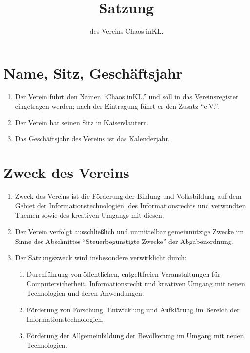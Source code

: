 \documentclass[a4paper, 12pt]{scrartcl}
\title{Satzung}
\subtitle{des Vereins Chaos inKL.}
\author{}
\date{}
\begin{document}
\maketitle

\tableofcontents

\newpage
\section{Name, Sitz, Geschäftsjahr}
\begin{enumerate}
	\item Der Verein führt den Namen "`Chaos inKL."' und soll in das Vereinsregister eingetragen werden; nach der Eintragung führt er den Zusatz "`e.V."'.
	\item Der Verein hat seinen Sitz in Kaiserslautern.
	\item Das Geschäftsjahr des Vereins ist das Kalenderjahr.
\end{enumerate}

\section{Zweck des Vereins}
\begin{enumerate}
	\item Zweck des Vereins ist die Förderung der Bildung und Volksbildung auf dem Gebiet der Informationstechnologien, des Informationsrechts und verwandten Themen sowie des kreativen Umgangs mit diesen.
	\item Der Verein verfolgt ausschließlich und unmittelbar gemeinnützige Zwecke im Sinne des Abschnittes "`Steuerbegünstigte Zwecke"' der Abgabenordnung.
	\item Der Satzungszweck wird insbesondere verwirklicht durch:
	\begin{enumerate}
		\item Durchführung von öffentlichen, entgeltfreien Veranstaltungen für Computersicherheit, Informationsrecht und kreativen Umgang mit neuen Technologien und deren Anwendungen.
		\item Förderung von Forschung, Entwicklung und Aufklärung im Bereich der Informationstechnologien.
		\item Förderung der Allgemeinbildung der Bevölkerung im Umgang mit neuen Technologien.
	\end{enumerate}
\end{enumerate}
\end{document}
